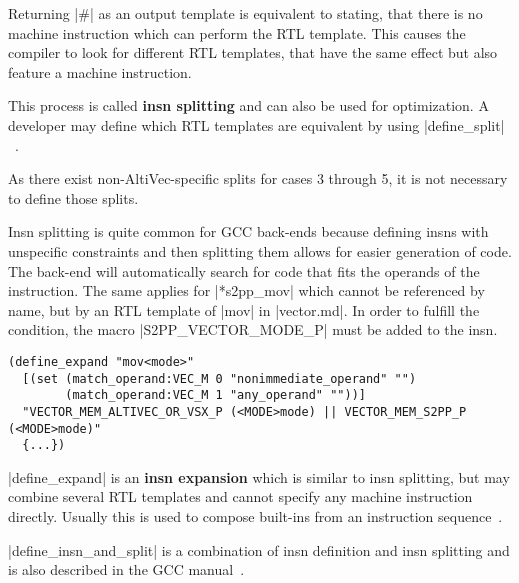 Returning |#| as an output template is equivalent to stating, that there is no machine instruction which can perform the \ac{RTL} template.
This causes the compiler to look for different \ac{RTL} templates, that have the same effect but also feature a machine instruction.

This process is called \textbf{insn splitting} and can also be used for optimization.
A developer may define which \ac{RTL} templates are equivalent by using |define_split|~\citep[16.16]{GCCint}.

As there exist non-AltiVec-specific splits for cases 3 through 5, it is not necessary to define those splits.

Insn splitting is quite common for \ac{GCC} back-ends because defining insns with unspecific constraints and then splitting them allows for easier generation of code.
The back-end will automatically search for code that fits the operands of the instruction.
The same applies for |*s2pp_mov| which cannot be referenced by name, but by an \ac{RTL} template of |mov| in |vector.md|.
In order to fulfill the condition, the macro |S2PP_VECTOR_MODE_P| must be added to the insn.
\begin{lstlisting}
(define_expand "mov<mode>"
  [(set (match_operand:VEC_M 0 "nonimmediate_operand" "")
        (match_operand:VEC_M 1 "any_operand" ""))]
  "VECTOR_MEM_ALTIVEC_OR_VSX_P (<MODE>mode) || VECTOR_MEM_S2PP_P (<MODE>mode)"
  {...})
\end{lstlisting}

|define_expand| is an \textbf{insn expansion} which is similar to insn splitting, but may combine several \ac{RTL} templates and cannot specify any machine instruction directly.
Usually this is used to compose built-ins from an instruction sequence~\citep[ch.~16.15]{GCCint}.

|define_insn_and_split| is a combination of insn definition and insn splitting and is also described in the \ac{GCC} manual~\citep[ch.~16.16]{GCCint}.

